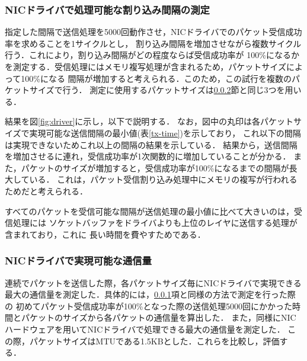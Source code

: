 \documentclass[submit,techreq,noauthor,dvipdfmx]{ipsj}
\begin{document}
\subsubsection{NICドライバで処理可能な割り込み間隔の測定}\label{sec:mint-interval}
指定した間隔で送信処理を5000回動作させ，NICドライバでのパケット受信成功率を求めることを1サイクルとし，
割り込み間隔を増加させながら複数サイクル行う．これにより，割り込み間隔がどの程度ならば受信成功率が
100\%になるかを測定する．受信処理にはメモリ複写処理が含まれるため，パケットサイズによって100\%になる
間隔が増加すると考えられる．このため，この試行を複数のパケットサイズで行う．
測定に使用するパケットサイズは\ref{sec:interval}節と同じ3つを用いる．

結果を図\ref{fig:driver}に示し，以下で説明する．
なお，図中の丸印は各パケットサイズで実現可能な送信間隔の最小値(表\ref{tx-time})を示しており，
これ以下の間隔は実現できないためこれ以上の間隔の結果を示している．
結果から，送信間隔を増加させるに連れ，受信成功率が1次関数的に増加していることが分かる．
また，パケットのサイズが増加すると，受信成功率が100\%になるまでの間隔が長大している．
これは，パケット受信割り込み処理中にメモリの複写が行われるためだと考えられる．

すべてのパケットを受信可能な間隔が送信処理の最小値に比べて大きいのは，受信処理には
ソケットバッファをドライバよりも上位のレイヤに送信する処理が含まれており，これに
長い時間を費やすためである．

\subsubsection{NICドライバで実現可能な通信量}\label{sec:interval}

連続でパケットを送信した際，各パケットサイズ毎にNICドライバで実現できる
最大の通信量を測定した．具体的には，\ref{sec:mint-interval}項と同様の方法で測定を行った際の
初めてパケット受信成功率が100\%となった際の送信処理5000回にかかった時間とパケットのサイズから各パケットの通信量を算出した．
また，同様にNICハードウェアを用いてNICドライバで処理できる最大の通信量を測定した．
この際，パケットサイズはMTUである1.5KBとした．これらを比較し，評価する．
\end{document}
